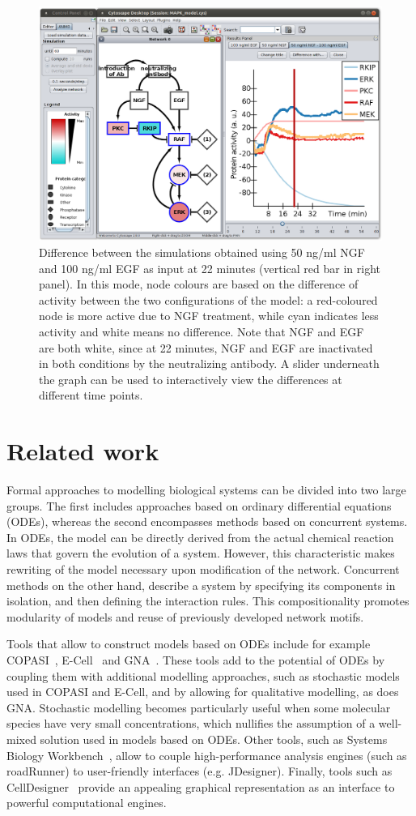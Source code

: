 \documentclass[journal, 10pt]{IEEEtran}
\begin{document}
\begin{figure}[htb]
\centering
  \includegraphics[width=.48\textwidth]{mapk_model_diff}
\caption{Difference between the simulations obtained using
50 ng/ml NGF and 100 ng/ml EGF as input at 22 minutes (vertical red bar in right panel). In this mode, node colours
are based on the difference of activity between the two configurations of the model:
a red-coloured node is more active due to NGF treatment, while cyan indicates less activity and white
means no difference. Note that NGF and EGF are both white, since at 22 minutes, 
NGF and EGF are inactivated in both conditions by the neutralizing antibody. A slider underneath the graph can be used to 
interactively view the differences at different time points. \label{fig:case-study-diff}}
\end{figure}




\section{Related work}\label{sec:related-work}
Formal approaches to modelling biological systems can be divided into two large groups. The first 
includes approaches based on ordinary differential equations (ODEs), whereas the second 
encompasses methods based on concurrent systems. In ODEs, the model can be directly derived from the actual chemical 
reaction laws that govern the evolution of a system. However, this characteristic makes rewriting of the model necessary
upon modification of the network. Concurrent methods on the other hand, describe a system by specifying its
components in isolation, and then defining the interaction rules. This compositionality promotes modularity of models and
reuse of previously developed network motifs.

Tools that allow to construct models based on ODEs include for example COPASI~\cite{copasi}, 
E-Cell~\cite{e-cell} and GNA~\cite{gna}.
These tools add to the potential of ODEs by coupling them with additional modelling approaches,
such as stochastic models used in COPASI and E-Cell, and by allowing for qualitative modelling, as does GNA.
Stochastic modelling becomes particularly useful when some
molecular species have very small concentrations, which nullifies the assumption of a well-mixed solution used in models based on ODEs.
Other tools, such as Systems Biology Workbench~\cite{sbw}, allow to couple high-performance
analysis engines (such as roadRunner) to user-friendly interfaces (e.g. JDesigner). Finally, tools such as CellDesigner~\cite{celldesigner}
provide an appealing graphical representation as an interface to powerful computational engines.
\end{document}
